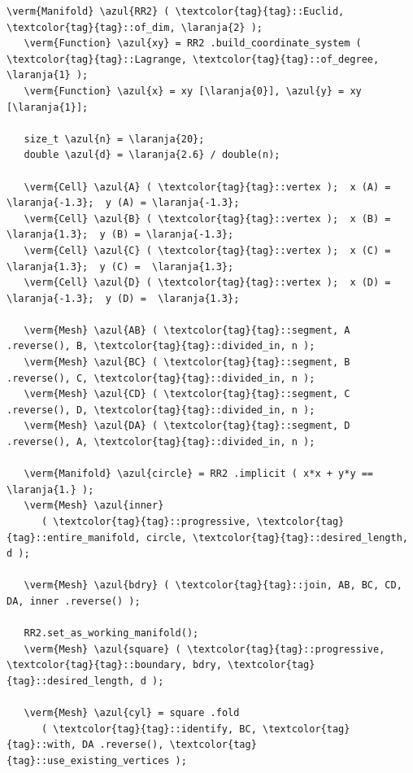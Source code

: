 \begin{Verbatim}[commandchars=\\\{\},formatcom=\small\tt,frame=single,
   label=parag-\ref{\numb section 7.\numb parag 19}.cpp,rulecolor=\color{moldura},
   baselinestretch=0.94,framesep=2mm                                             ]
   \verm{Manifold} \azul{RR2} ( \textcolor{tag}{tag}::Euclid, \textcolor{tag}{tag}::of_dim, \laranja{2} );
   \verm{Function} \azul{xy} = RR2 .build_coordinate_system ( \textcolor{tag}{tag}::Lagrange, \textcolor{tag}{tag}::of_degree, \laranja{1} );
   \verm{Function} \azul{x} = xy [\laranja{0}], \azul{y} = xy [\laranja{1}];

   size_t \azul{n} = \laranja{20};
   double \azul{d} = \laranja{2.6} / double(n);

   \verm{Cell} \azul{A} ( \textcolor{tag}{tag}::vertex );  x (A) = \laranja{-1.3};  y (A) = \laranja{-1.3};
   \verm{Cell} \azul{B} ( \textcolor{tag}{tag}::vertex );  x (B) =  \laranja{1.3};  y (B) = \laranja{-1.3};
   \verm{Cell} \azul{C} ( \textcolor{tag}{tag}::vertex );  x (C) =  \laranja{1.3};  y (C) =  \laranja{1.3};
   \verm{Cell} \azul{D} ( \textcolor{tag}{tag}::vertex );  x (D) = \laranja{-1.3};  y (D) =  \laranja{1.3};

   \verm{Mesh} \azul{AB} ( \textcolor{tag}{tag}::segment, A .reverse(), B, \textcolor{tag}{tag}::divided_in, n );
   \verm{Mesh} \azul{BC} ( \textcolor{tag}{tag}::segment, B .reverse(), C, \textcolor{tag}{tag}::divided_in, n );
   \verm{Mesh} \azul{CD} ( \textcolor{tag}{tag}::segment, C .reverse(), D, \textcolor{tag}{tag}::divided_in, n );
   \verm{Mesh} \azul{DA} ( \textcolor{tag}{tag}::segment, D .reverse(), A, \textcolor{tag}{tag}::divided_in, n );

   \verm{Manifold} \azul{circle} = RR2 .implicit ( x*x + y*y == \laranja{1.} );
   \verm{Mesh} \azul{inner}
      ( \textcolor{tag}{tag}::progressive, \textcolor{tag}{tag}::entire_manifold, circle, \textcolor{tag}{tag}::desired_length, d );

   \verm{Mesh} \azul{bdry} ( \textcolor{tag}{tag}::join, AB, BC, CD, DA, inner .reverse() );

   RR2.set_as_working_manifold();
   \verm{Mesh} \azul{square} ( \textcolor{tag}{tag}::progressive, \textcolor{tag}{tag}::boundary, bdry, \textcolor{tag}{tag}::desired_length, d );

   \verm{Mesh} \azul{cyl} = square .fold
      ( \textcolor{tag}{tag}::identify, BC, \textcolor{tag}{tag}::with, DA .reverse(), \textcolor{tag}{tag}::use_existing_vertices );
\end{Verbatim}


